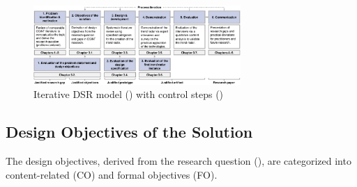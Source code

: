 \documentclass[10pt]{article}
\begin{document}
\begin{figure}[thb]
    \centering
    \includegraphics[width=0.7\textwidth]{PDF/images/cropped DSR_V01.pdf}
    \caption{Iterative DSR model (\cite{Peffers.2007}) with control steps (\cite{Sonnenberg.2012})}
    \label{fig: DSRM}
\end{figure}

\subsection{Design Objectives of the Solution} \label{sec:designobjectives}


The design objectives, derived from the research question (\cite{Peffers.2007}), are categorized into content-related (CO) and formal objectives (FO).
\end{document}
